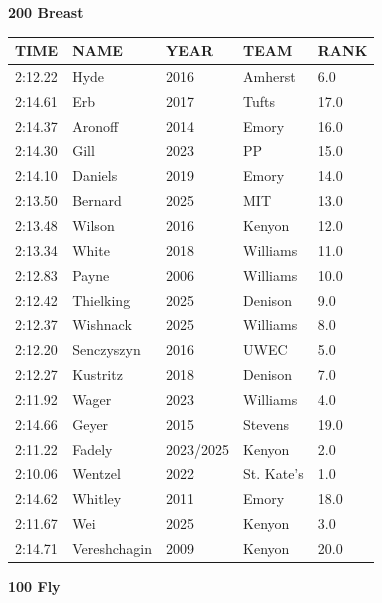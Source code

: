 \begin{table}[H]
\centering
\begin{minipage}[t]{0.48\textwidth}
\centering
\textbf{200 Breast}\\[0.1cm]
\begin{tabular}{@{}p{1.8cm}p{2.8cm}p{1.2cm}p{1.4cm}p{0.8cm}@{}}
\hline
    \textbf{TIME} & \textbf{NAME} & \textbf{YEAR} & \textbf{TEAM} & \textbf{RANK} \\
\hline
    2:12.22 & Hyde & 2016 & Amherst & 6.0 \\
    2:14.61 & Erb & 2017 & Tufts & 17.0 \\
    2:14.37 & Aronoff & 2014 & Emory & 16.0 \\
    2:14.30 & Gill & 2023 & PP & 15.0 \\
    2:14.10 & Daniels & 2019 & Emory & 14.0 \\
    2:13.50 & Bernard & 2025 & MIT & 13.0 \\
    2:13.48 & Wilson & 2016 & Kenyon & 12.0 \\
    2:13.34 & White & 2018 & Williams & 11.0 \\
    2:12.83 & Payne & 2006 & Williams & 10.0 \\
    2:12.42 & Thielking & 2025 & Denison & 9.0 \\
    2:12.37 & Wishnack & 2025 & Williams & 8.0 \\
    2:12.20 & Senczyszyn & 2016 & UWEC & 5.0 \\
    2:12.27 & Kustritz & 2018 & Denison & 7.0 \\
    2:11.92 & Wager & 2023 & Williams & 4.0 \\
    2:14.66 & Geyer & 2015 & Stevens & 19.0 \\
    2:11.22 & Fadely & 2023/2025 & Kenyon & 2.0 \\
    2:10.06 & Wentzel & 2022 & St. Kate's & 1.0 \\
    2:14.62 & Whitley & 2011 & Emory & 18.0 \\
    2:11.67 & Wei & 2025 & Kenyon & 3.0 \\
    2:14.71 & Vereshchagin & 2009 & Kenyon & 20.0 \\
\hline
\end{tabular}
\end{minipage}\hfill
\begin{minipage}[t]{0.48\textwidth}
\centering
\textbf{100 Fly}\\[0.1cm]
\begin{tabular}{@{}p{1.8cm}p{2.8cm}p{1.2cm}p{1.4cm}p{0.8cm}@{}}

\end{tabular}
\end{minipage}
\end{table}
